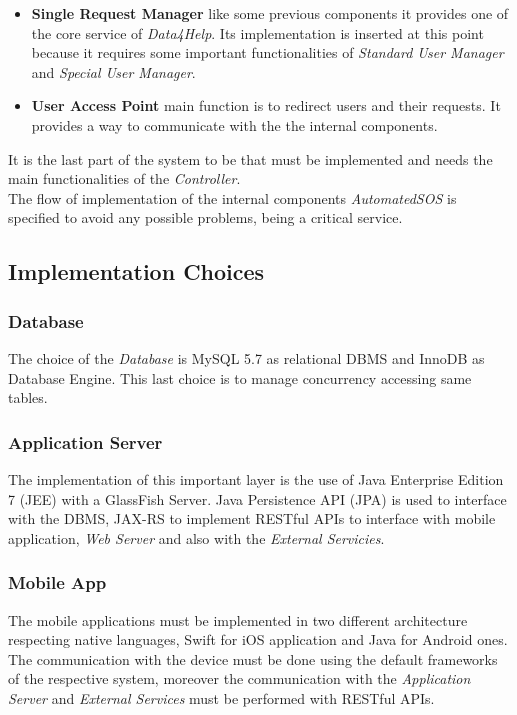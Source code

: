 \begin{itemize}
  \item \textbf{Single Request Manager} like some previous components it provides one of the core service of \textit{Data4Help}. Its implementation is inserted at this point because it requires some important functionalities of \textit{Standard User Manager} and \textit{Special User Manager}.
  \item \textbf{User Access Point} main function is to redirect users and their requests. It provides a way to communicate with the the internal components.
\end{itemize}

\myparagraph{}
It is the last part of the system to be that must be implemented and needs the main functionalities of the \textit{Controller}.\\
The flow of implementation of the internal components \textit{AutomatedSOS} is specified to avoid any possible problems, being a critical service.

\subsection{Implementation Choices}

\subsubsection{Database}
The choice of the \textit{Database} is MySQL 5.7 as relational DBMS and InnoDB as Database Engine. This last choice is to manage concurrency accessing same tables.

\subsubsection{Application Server}
The implementation of this important layer is the use of Java Enterprise Edition 7 (JEE) with a GlassFish Server. Java Persistence API (JPA) is used to interface with the DBMS, JAX-RS to implement RESTful APIs to interface with mobile application, \textit{Web Server} and also with the \textit{External Servicies}.

\subsubsection{Mobile App}
The mobile applications must be implemented in two different architecture respecting native languages, Swift for iOS application and Java for Android ones. The communication with the device must be done using the default frameworks of the respective system, moreover the communication with the \textit{Application Server} and \textit{External Services} must be performed with RESTful APIs.

